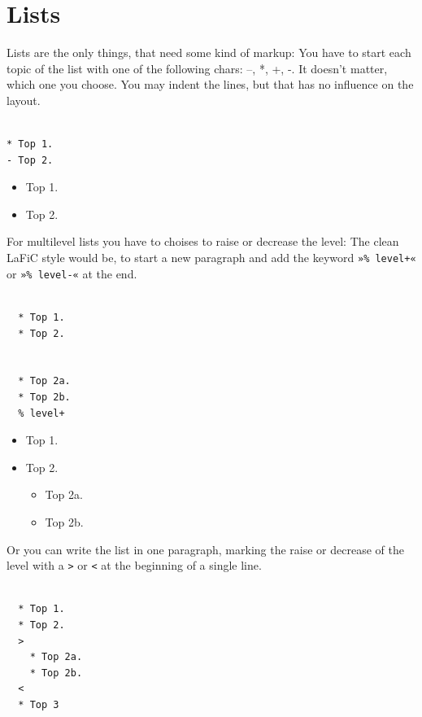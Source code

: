 \documentclass{article}
\begin{document}
\section{Lists}

{Lists are the only things, that need some kind of
markup: You have to start each topic of the list with one of
the following chars: –, *, +, -. It doesn't matter, which one you
choose. You may indent the lines, but that has no influence
on the layout.\\}

\begin{verbatim}

* Top 1.
- Top 2.
\end{verbatim}


\begin{itemize}
\item Top 1.
\item Top 2.
\end{itemize}


{For multilevel lists you have to choises to raise or
decrease the level: The clean LaFiC style would be,
to start a new paragraph and add the keyword \texttt{»\% level+«}
or \texttt{»\% level-«} at the end.\\}

\begin{verbatim}

  * Top 1.
  * Top 2.


  * Top 2a.
  * Top 2b.
  % level+
\end{verbatim}


\begin{itemize}
\item Top 1.
\item Top 2.

\begin{itemize}
\item Top 2a.
\item Top 2b.
\end{itemize}

\end{itemize}


{Or you can write the list in one paragraph, marking the
raise or decrease of the level with a \texttt{>} or \texttt{<} at the
beginning of a single line.\\}

\begin{verbatim}

  * Top 1.
  * Top 2.
  >
    * Top 2a.
    * Top 2b.
  <
  * Top 3
\end{verbatim}
\end{document}
